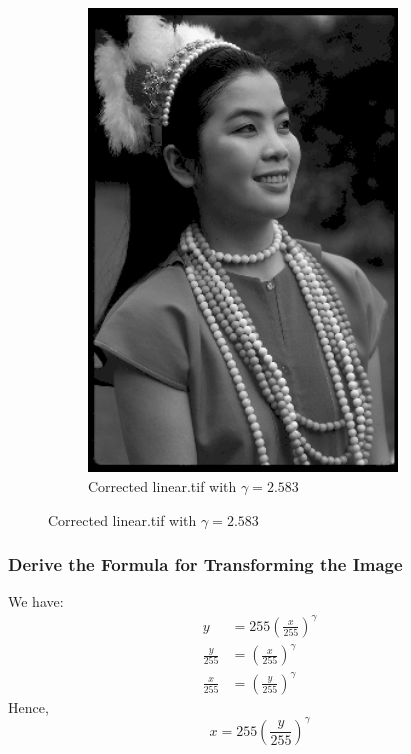 \documentclass{article}
\begin{document}
\begin{figure}[h]
\begin{subfigure}{0.5\textwidth}
				\includegraphics[width=0.9\textwidth]{linear_gamma.png}
				\caption{Corrected linear.tif with $\gamma=2.583$}
			\end{subfigure}
		\end{figure}

	\subsubsection{Derive the Formula for Transforming the Image}
		We have:
		\begin{align*}
			y &= 255(\frac{x}{255})^{\gamma} \\
			\frac{y}{255} &= (\frac{x}{255})^{\gamma} \\
			\frac{x}{255} &= (\frac{y}{255})^{\gamma}
		\end{align*}
		Hence,
		\begin{equation}
			x = 255(\frac{y}{255})^{\gamma}
		\end{equation}
\end{document}
